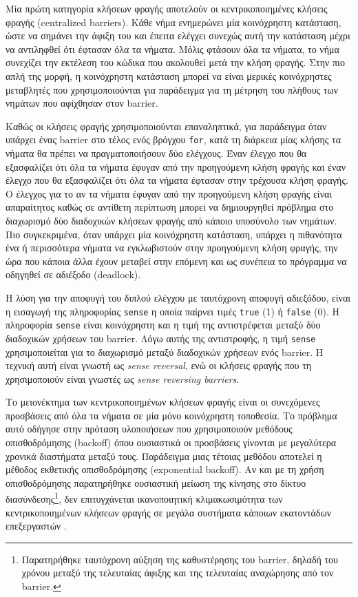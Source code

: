 Μία πρώτη κατηγορία κλήσεων φραγής αποτελούν οι κεντρικοποιημένες κλήσεις φραγής (centralized barriers). Κάθε νήμα ενημερώνει μία κοινόχρηστη κατάσταση, ώστε να σημάνει την άφιξη του και έπειτα ελέγχει συνεχώς αυτή την κατάσταση μέχρι να αντιληφθεί ότι έφτασαν όλα τα νήματα. Μόλις φτάσουν όλα τα νήματα, το νήμα συνεχίζει την εκτέλεση του κώδικα που ακολουθεί μετά την κλήση φραγής. Στην πιο απλή της μορφή, η κοινόχρηστη κατάσταση μπορεί να είναι μερικές κοινόχρηστες μεταβλητές που χρησιμοποιούνται για παράδειγμα για τη μέτρηση του πλήθους των νημάτων που αφίχθησαν στον barrier.

Καθώς οι κλήσεις φραγής χρησιμοποιούνται επαναληπτικά, για παράδειγμα όταν υπάρχει ένας barrier στο τέλος ενός βρόγχου \texttt{for}, κατά τη διάρκεια μίας κλήσης τα νήματα θα πρέπει να πραγματοποιήσουν δύο ελέγχους. Έναν έλεγχο που θα εξασφαλίζει ότι όλα τα νήματα έφυγαν από την προηγούμενη κλήση φραγής και έναν έλεγχο που θα εξασφαλίζει ότι όλα τα νήματα έφτασαν στην τρέχουσα κλήση φραγής. Ο έλεγχος για το αν τα νήματα έφυγαν από την προηγούμενη κλήση φραγής είναι απαραίτητος καθώς σε αντίθετη περίπτωση μπορεί να δημιουργηθεί πρόβλημα στο διαχωρισμό δύο διαδοχικών κλήσεων φραγής από κάποιο υποσύνολο των νημάτων. Πιο συγκεκριμένα, όταν υπάρχει μία κοινόχρηστη κατάσταση, υπάρχει η πιθανότητα ένα ή περισσότερα νήματα να εγκλωβιστούν στην προηγούμενη κλήση φραγής, την ώρα που κάποια άλλα έχουν μεταβεί στην επόμενη και ως συνέπεια το πρόγραμμα να οδηγηθεί σε αδιέξοδο (deadlock).

Η λύση για την αποφυγή του διπλού ελέγχου με ταυτόχρονη αποφυγή αδιεξόδου, είναι η εισαγωγή της πληροφορίας \texttt{sense} η οποία παίρνει τιμές \texttt{true} (1) ή \texttt{false} (0). Η πληροφορία \texttt{sense} είναι κοινόχρηστη και η τιμή της αντιστρέφεται μεταξύ δύο διαδοχικών χρήσεων του barrier. Λόγω αυτής της αντιστροφής, η τιμή \texttt{sense} χρησιμοποιείται για το διαχωρισμό μεταξύ διαδοχικών χρήσεων ενός barrier. Η τεχνική αυτή είναι γνωστή ως \textit{sense reversal}, ενώ οι κλήσεις φραγής που τη χρησιμοποιούν είναι γνωστές ως \textit{sense reversing barriers}.

Το μειονέκτημα των κεντρικοποιημένων κλήσεων φραγής είναι οι συνεχόμενες προσβάσεις από όλα τα νήματα σε μία μόνο κοινόχρηστη τοποθεσία. Το πρόβλημα αυτό οδήγησε στην πρόταση υλοποιήσεων που χρησιμοποιούν μεθόδους οπισθοδρόμησης (backoff) όπου ουσιαστικά οι προσβάσεις γίνονται με μεγαλύτερα χρονικά διαστήματα μεταξύ τους. Παράδειγμα μιας τέτοιας μεθόδου αποτελεί η μέθοδος εκθετικής οπισθοδρόμησης (exponential backoff). Αν και με τη χρήση οπισθοδρόμησης παρατηρήθηκε ουσιαστική μείωση της κίνησης στο δίκτυο διασύνδεσης\footnote{Παρατηρήθηκε ταυτόχρονη αύξηση της καθυστέρησης του barrier, δηλαδή του χρόνου μεταξύ της τελευταίας άφιξης και της τελευταίας αναχώρησης από τον barrier.}, δεν επιτυγχάνεται ικανοποιητική κλιμακωσιμότητα των κεντρικοποιημένων κλήσεων φραγής σε μεγάλα συστήματα κάποιων εκατοντάδων επεξεργαστών \cite{mellor1991algorithms}.

